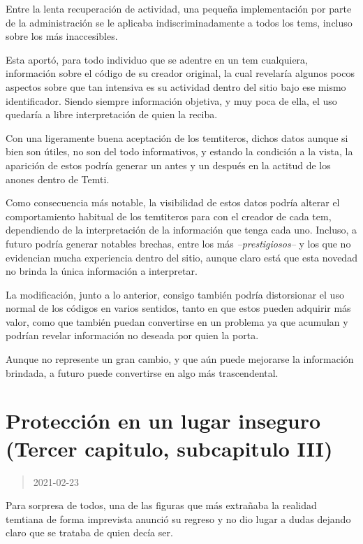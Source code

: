 \documentclass[
  spanish,
]{book}
\begin{document}
Entre la lenta recuperación de actividad, una pequeña implementación por parte de la administración se le aplicaba indiscriminadamente a todos los tems, incluso sobre los más inaccesibles.

Esta aportó, para todo individuo que se adentre en un tem cualquiera, información sobre el código de su creador original, la cual revelaría algunos pocos aspectos sobre que tan intensiva es su actividad dentro del sitio bajo ese mismo identificador. Siendo siempre información objetiva, y muy poca de ella, el uso quedaría a libre interpretación de quien la reciba.

Con una ligeramente buena aceptación de los temtiteros, dichos datos aunque si bien son útiles, no son del todo informativos, y estando la condición a la vista, la aparición de estos podría generar un antes y un después en la actitud de los anones dentro de Temti.

Como consecuencia más notable, la visibilidad de estos datos podría alterar el comportamiento habitual de los temtiteros para con el creador de cada tem, dependiendo de la interpretación de la información que tenga cada uno. Incluso, a futuro podría generar notables brechas, entre los más \emph{--prestigiosos--} y los que no evidencian mucha experiencia dentro del sitio, aunque claro está que esta novedad no brinda la única información a interpretar.

La modificación, junto a lo anterior, consigo también podría distorsionar el uso normal de los códigos en varios sentidos, tanto en que estos pueden adquirir más valor, como que también puedan convertirse en un problema ya que acumulan y podrían revelar información no deseada por quien la porta.

Aunque no represente un gran cambio, y que aún puede mejorarse la información brindada, a futuro puede convertirse en algo más trascendental.

\hypertarget{protecciuxf3n-en-un-lugar-inseguro-tercer-capitulo-subcapitulo-iii}{%
\section{Protección en un lugar inseguro (Tercer capitulo, subcapitulo III)}\label{protecciuxf3n-en-un-lugar-inseguro-tercer-capitulo-subcapitulo-iii}}

\begin{quote}
2021-02-23
\end{quote}

Para sorpresa de todos, una de las figuras que más extrañaba la realidad temtiana de forma imprevista anunció su regreso y no dio lugar a dudas dejando claro que se trataba de quien decía ser.
\end{document}
